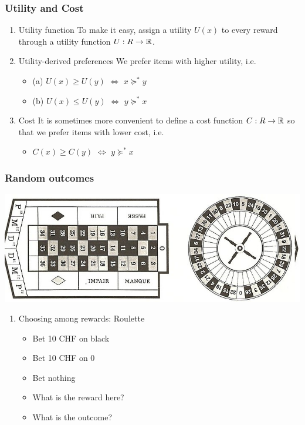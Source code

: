 \documentclass[smaller]{article}
\begin{document}
\subsubsection{Utility and Cost}
\label{sec:org4f9b2e9}
\begin{enumerate}
\item Utility function
\label{sec:org49459f0}
To make it easy, assign a utility \(U(x)\) to every reward through a
utility function \(U : R \to \mathbb{R}\).

\item Utility-derived preferences
\label{sec:org5eb5d6a}
We prefer items with higher utility, i.e.
\begin{itemize}
\item (a) \(U(x) \geq U(y)\) \(\Leftrightarrow\) \(x \succeq^* y\)
\item (b) \(U(x) \leq U(y)\) \(\Leftrightarrow\) \(y \succeq^* x\)
\end{itemize}
\item Cost
\label{sec:org875ee14}
It is sometimes more convenient to define a cost function \(C: R \to \mathbb{R}\) so that we prefer items with lower cost, i.e.
\begin{itemize}
\item \(C(x) \geq C(y)\) \(\Leftrightarrow\) \(y \succeq^* x\)
\end{itemize}
\end{enumerate}

\subsubsection{Random outcomes}
\label{sec:org4e0e1b6}
\begin{center}
\includegraphics[width=.9\linewidth]{./figures/roulette.jpg}
\end{center}


\begin{enumerate}
\item Choosing among rewards: Roulette
\label{sec:org5efd2f7}
\begin{itemize}
\item\relax [A] Bet 10 CHF on black
\item\relax [B] Bet 10 CHF on 0
\item\relax [C] Bet nothing

\item What is the reward here?
\item What is the outcome?
\end{itemize}
\end{enumerate}
\end{document}
